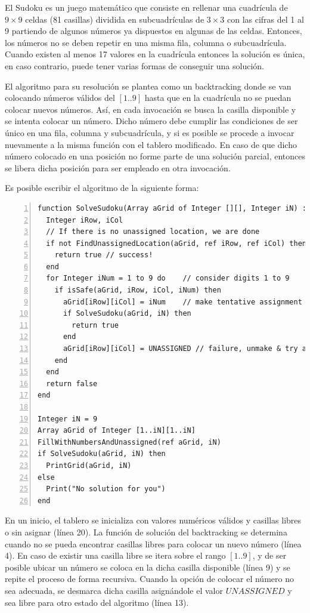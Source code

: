 El Sudoku es un juego matemático que consiste en rellenar una cuadrícula de $9 \times 9$ celdas (81 casillas) dividida en subcuadrículas de $3 \times 3$ con las cifras del 1 al 9 partiendo de algunos números ya dispuestos en algunas de las celdas. Entonces, los números no se deben repetir en una misma fila, columna o subcuadrícula. Cuando existen al menos 17 valores en la cuadrícula entonces la solución es única, en caso contrario, puede tener varias formas de conseguir una solución.

El algoritmo para su resolución se plantea como un backtracking donde se van colocando números válidos del $[1..9]$ hasta que en la cuadrícula no se puedan colocar nuevos números. Así, en cada invocación se busca la casilla disponible y se intenta colocar un número. Dicho número debe cumplir las condiciones de ser único en una fila, columna y subcuadrícula, y si es posible se procede a invocar nuevamente a la misma función con el tablero modificado. En caso de que dicho número colocado en una posición no forme parte de una solución parcial, entonces se libera dicha posición para ser empleado en otra invocación.

Es posible escribir el algoritmo de la siguiente forma:

\begin{lstlisting}[upquote=true, language=pseudo, numbers=left]
function SolveSudoku(Array aGrid of Integer [][], Integer iN) : Boolean
  Integer iRow, iCol
  // If there is no unassigned location, we are done
  if not FindUnassignedLocation(aGrid, ref iRow, ref iCol) then
    return true // success!
  end
  for Integer iNum = 1 to 9 do    // consider digits 1 to 9
    if isSafe(aGrid, iRow, iCol, iNum) then
      aGrid[iRow][iCol] = iNum    // make tentative assignment
      if SolveSudoku(aGrid, iN) then
        return true
      end
      aGrid[iRow][iCol] = UNASSIGNED // failure, unmake & try again
    end
  end
  return false
end

Integer iN = 9
Array aGrid of Integer [1..iN][1..iN]
FillWithNumbersAndUnassigned(ref aGrid, iN)
if SolveSudoku(aGrid, iN) then
  PrintGrid(aGrid, iN)
else
  Print("No solution for you")
end
\end{lstlisting}

En un inicio, el tablero se inicializa con valores numéricos válidos y casillas libres o sin asignar (línea 20). La función de solución del backtracking se determina cuando no se pueda encontrar casillas libres para colocar un nuevo número (línea 4). En caso de existir una casilla libre se itera sobre el rango $[1..9]$, y de ser posible ubicar un número se coloca en la dicha casilla disponible (línea 9) y se repite el proceso de forma recursiva. Cuando la opción de colocar el número no sea adecuada, se desmarca dicha casilla asignándole el valor $UNASSIGNED$ y sea libre para otro estado del algoritmo (línea 13).


